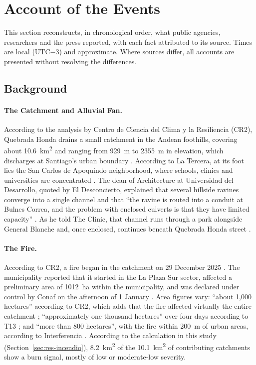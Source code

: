 \section{Account of the Events}\label{sec:relato}
This section reconstructs, in chronological order, what public agencies, researchers and the press reported, with each fact attributed to its source. Times are local (UTC$-$3) and approximate. Where sources differ, all accounts are presented without resolving the differences.

\subsection*{Background}
\paragraph{The Catchment and Alluvial Fan.} According to the analysis by Centro de Ciencia del Clima y la Resiliencia (CR2), Quebrada Honda drains a small catchment in the Andean foothills, covering about \SI{10.6}{km^2} and ranging from \SI{929}{m} to \SI{2355}{m} in elevation, which discharges at Santiago's urban boundary \citep{cr2_2026}. According to La Tercera, at its foot lies the San Carlos de Apoquindo neighborhood, where schools, clinics and universities are concentrated \citep{latercera2026zonacero}. The dean of Architecture at Universidad del Desarrollo, quoted by El Desconcierto, explained that several hillside ravines converge into a single channel and that ``the ravine is routed into a conduit at Bulnes Correa, and the problem with enclosed culverts is that they have limited capacity'' \citep{eldesconcierto2026}. As he told The Clinic, that channel runs through a park alongside General Blanche and, once enclosed, continues beneath Quebrada Honda street \citep{theclinic2026allard}.

\paragraph{The Fire.} According to CR2, a fire began in the catchment on 29 December 2025 \citep{cr2_2026}. The municipality reported that it started in the La Plaza Sur sector, affected a preliminary area of \SI{1012}{ha} within the municipality, and was declared under control by Conaf on the afternoon of 1 January \citep{lascondes2026}. Area figures vary: ``about 1,000 hectares'' according to CR2, which adds that the fire affected virtually the entire catchment \citep{cr2_2026}; ``approximately one thousand hectares'' over four days according to T13 \citep{t13_2026mallas}; and ``more than 800 hectares'', with the fire within \SI{200}{m} of urban areas, according to Interferencia \citep{interferencia2026}. According to the calculation in this study (Section~\ref{sec:res-incendio}), \SI{8.2}{km^2} of the \SI{10.1}{km^2} of contributing catchments show a burn signal, mostly of low or moderate-low severity.

